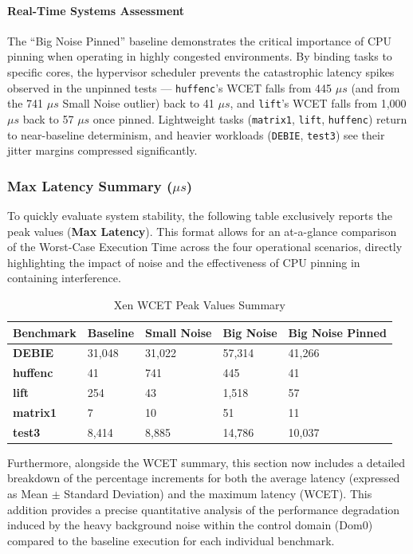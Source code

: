 \paragraph{Real-Time Systems
Assessment}\label{real-time-systems-assessment-7}

The ``Big Noise Pinned'' baseline demonstrates the critical importance
of CPU pinning when operating in highly congested environments. By
binding tasks to specific cores, the hypervisor scheduler prevents the
catastrophic latency spikes observed in the unpinned tests ---
\texttt{huffenc}'s WCET falls from 445 $\mu s$ (and from the 741 $\mu s$ Small
Noise outlier) back to 41 $\mu s$, and \texttt{lift}'s WCET falls from 1,000
$\mu s$ back to 57 $\mu s$ once pinned. Lightweight tasks (\texttt{matrix1},
\texttt{lift}, \texttt{huffenc}) return to near-baseline determinism,
and heavier workloads (\texttt{DEBIE}, \texttt{test3}) see their jitter
margins compressed significantly.

\subsubsection{Max Latency Summary
($\mu s$)}\label{max-latency-summary-ux3bcs-1}

To quickly evaluate system stability, the following table exclusively
reports the peak values (\textbf{Max Latency}). This format allows for
an at-a-glance comparison of the Worst-Case Execution Time across the
four operational scenarios, directly highlighting the impact of noise
and the effectiveness of CPU pinning in containing interference.

\begin{table}
\centering
\caption{Xen WCET Peak Values Summary}
\label{tab:xen:wcet-peak}
\begin{tabularx}{\linewidth}{@{}YYYYY@{}}
\toprule
Benchmark & Baseline & Small Noise & Big Noise & Big Noise Pinned\tabularnewline
\midrule
\textbf{DEBIE} & 31,048 & 31,022 & 57,314 & 41,266\tabularnewline
\textbf{huffenc} & 41 & 741 & 445 & 41\tabularnewline
\textbf{lift} & 254 & 43 & 1,518 & 57\tabularnewline
\textbf{matrix1} & 7 & 10 & 51 & 11\tabularnewline
\textbf{test3} & 8,414 & 8,885 & 14,786 & 10,037\tabularnewline
\bottomrule
\end{tabularx}
\end{table}

Furthermore, alongside the WCET summary, this section now includes a
detailed breakdown of the percentage increments for both the average
latency (expressed as Mean \(\pm\) Standard Deviation) and the maximum
latency (WCET). This addition provides a precise quantitative analysis
of the performance degradation induced by the heavy background noise
within the control domain (Dom0) compared to the baseline execution for
each individual benchmark.

